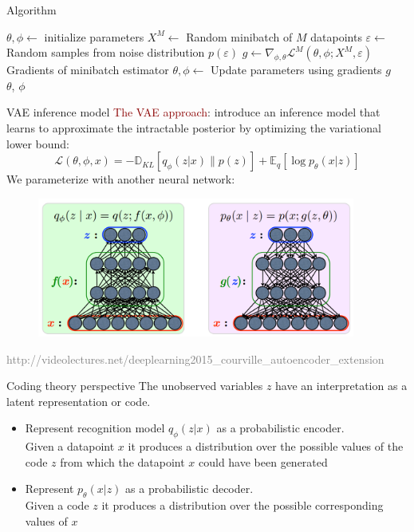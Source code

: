 \documentclass[unicode,11pt]{beamer}
\begin{document}
\begin{frame}[fragile]{Algorithm}
  \begin{algorithmic}
    \State $\theta, \phi \gets$ initialize parameters
    \Repeat 
       \State $X^M \gets$ Random minibatch of $M$ datapoints 
       \State $\varepsilon \gets$ Random samples from noise distribution $p(\varepsilon)$
       \State $g \gets \nabla_{\phi, \theta} \mathcal{L}^M(\theta, \phi; X^M, \varepsilon) $ Gradients of minibatch estimator
       \State $\theta, \phi \gets$ Update parameters using gradients $g$
    \\
    \Return $\theta$, $\phi$
  \end{algorithmic}
  
\end{frame}

\begin{frame}[fragile]{VAE inference model}
  \textcolor{darkred}{The VAE approach}: introduce an inference model that
  learns to approximate the intractable posterior by optimizing the variational lower bound: 
  $$ \mathcal{L}(\theta, \phi, x) = -\mathbb{D}_{KL}[q_{\phi} (z|x) \parallel p(z)] + 
  \mathbb{E}_q [\log p_\theta (x|z)] $$
  We parameterize with another neural network:
  \begin{figure}[htbp]
    \includegraphics[height=130pt, keepaspectratio = true]{images/vae}   
  \end{figure}
  \tiny \textcolor{gray}{http://videolectures.net/deeplearning2015\_courville\_autoencoder\_extension}
\end{frame}

\begin{frame}[fragile]{Coding theory perspective}
  The unobserved variables $z$ have an interpretation as a latent representation or code.

  \begin{itemize}
    \item Represent recognition model $q_{\phi}(z|x)$ as a probabilistic encoder.\\
        Given a datapoint $x$ it produces a distribution over the possible values of the code $z$ 
        from which the datapoint $x$ could have been generated
    \item Represent $p_{\theta}(x|z)$ as a probabilistic decoder.\\
        Given a code $z$ it produces a distribution over the possible corresponding values of $x$
  \end{itemize}
\end{frame}
\end{document}
